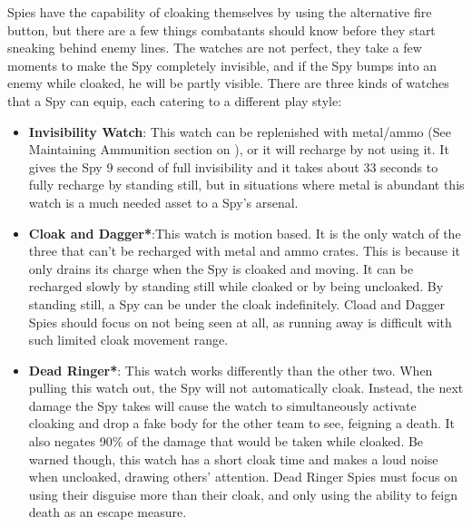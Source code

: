  Spies have the capability of cloaking themselves by using the alternative fire button, but there are a few things combatants should know before they start sneaking behind enemy lines. The watches are not perfect, they take a few moments to make the Spy completely invisible, and if the Spy bumps into an enemy while cloaked, he will be partly visible. There are three kinds of watches that a Spy can equip, each catering to a different play style:
\begin {itemize}
\item {\bf Invisibility Watch}: This watch can be replenished with metal/ammo (See Maintaining Ammunition section on \pageref{Maintaining_Ammunition}), or it will recharge by not using it. It gives the Spy 9 second of full invisibility and it takes about 33 seconds to fully recharge by standing still, but in situations where metal is abundant this watch is a much needed asset to a Spy's arsenal.
\item {\bf Cloak and Dagger*}:This watch is motion based. It is the only watch of the three that can't be recharged with metal and ammo crates. This is because it only drains its charge when the Spy is cloaked and moving. It can be recharged slowly by standing still while cloaked or by being uncloaked. By standing still, a Spy can be under the cloak indefinitely. Cload and Dagger Spies should focus on not being seen at all, as running away is difficult with such limited cloak movement range.
\item {\bf Dead Ringer*}: This watch works differently than the other two. When pulling this watch out, the Spy will not automatically cloak. Instead, the next damage the Spy takes will cause the watch to simultaneously activate cloaking and drop a fake body for the other team to see, feigning a death. It also negates 90\% of the damage that would be taken while cloaked. Be warned though, this watch has a short cloak time and makes a loud noise when uncloaked, drawing others' attention. Dead Ringer Spies must focus on using their disguise more than their cloak, and only using the ability to feign death as an escape measure.
\end {itemize}
